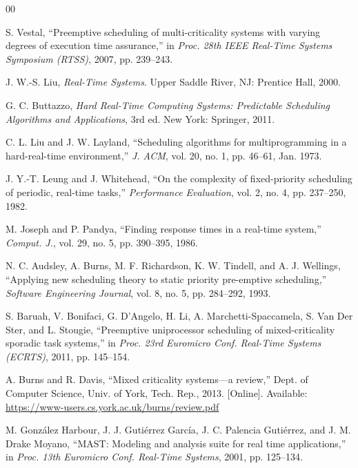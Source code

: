 \documentclass[conference]{IEEEtran}
\begin{document}
\begin{thebibliography}{00}

S. Vestal, ``Preemptive scheduling of multi-criticality systems with varying degrees of execution time assurance,'' in \textit{Proc. 28th IEEE Real-Time Systems Symposium (RTSS)}, 2007, pp. 239--243.

J. W.-S. Liu, \textit{Real-Time Systems}. Upper Saddle River, NJ: Prentice Hall, 2000.

G. C. Buttazzo, \textit{Hard Real-Time Computing Systems: Predictable Scheduling Algorithms and Applications}, 3rd ed. New York: Springer, 2011.

C. L. Liu and J. W. Layland, ``Scheduling algorithms for multiprogramming in a hard-real-time environment,'' \textit{J. ACM}, vol. 20, no. 1, pp. 46--61, Jan. 1973.

J. Y.-T. Leung and J. Whitehead, ``On the complexity of fixed-priority scheduling of periodic, real-time tasks,'' \textit{Performance Evaluation}, vol. 2, no. 4, pp. 237--250, 1982.

M. Joseph and P. Pandya, ``Finding response times in a real-time system,'' \textit{Comput. J.}, vol. 29, no. 5, pp. 390--395, 1986.

N. C. Audsley, A. Burns, M. F. Richardson, K. W. Tindell, and A. J. Wellings, ``Applying new scheduling theory to static priority pre-emptive scheduling,'' \textit{Software Engineering Journal}, vol. 8, no. 5, pp. 284--292, 1993.

S. Baruah, V. Bonifaci, G. D'Angelo, H. Li, A. Marchetti-Spaccamela, S. Van Der Ster, and L. Stougie, ``Preemptive uniprocessor scheduling of mixed-criticality sporadic task systems,'' in \textit{Proc. 23rd Euromicro Conf. Real-Time Systems (ECRTS)}, 2011, pp. 145--154.

A. Burns and R. Davis, ``Mixed criticality systems---a review,'' Dept. of Computer Science, Univ. of York, Tech. Rep., 2013. [Online]. Available: \url{https://www-users.cs.york.ac.uk/burns/review.pdf}

M. González Harbour, J. J. Gutiérrez García, J. C. Palencia Gutiérrez, and J. M. Drake Moyano, ``MAST: Modeling and analysis suite for real time applications,'' in \textit{Proc. 13th Euromicro Conf. Real-Time Systems}, 2001, pp. 125--134.


\end{thebibliography}
\end{document}
